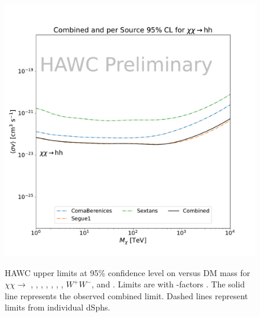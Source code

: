 \begin{figure}[h]
{    \includegraphics[scale=0.21]{figures/mtd_hawc_dm/results/Combined95_New_duck_hh_.pdf}
    }
    \caption{HAWC upper limits at 95\% confidence level on \sv versus DM mass for $\chi\chi \rightarrow $ , , , , , , , $W^+ W^-$, and . Limits are with \LS \J-factors \cite{DM_Strigari20}. The solid line represents the observed combined limit. Dashed lines represent limits from individual dSphs.}
\label{fig:mtd_limits_1of2}
\end{figure}

